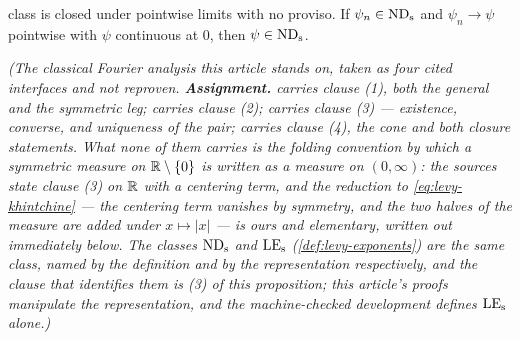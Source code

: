 \begin{proposition}
\begin{enumerate}
class is closed under pointwise limits with no proviso. If $\psi_n \in \mathrm{ND}_{\mathrm{s}}$ and
$\psi_n \to \psi$ pointwise with $\psi$ continuous at $0$, then $\psi \in \mathrm{ND}_{\mathrm{s}}$.
\end{enumerate}
\statusA\quad{}\quad{}\quad{}\quad{}\quad\emph{(The
classical Fourier analysis this article stands on, taken as four cited interfaces and not
reproven. \textbf{Assignment.}  carries clause (1), both the general and the
symmetric leg;  carries clause (2);  carries clause (3) --- existence,
converse, and uniqueness of the pair;  carries clause (4), the cone and both
closure statements. What none of them carries is the \emph{folding} convention by which a
symmetric \Levy{} measure on $\mathbb{R} \setminus \{0\}$ is written as a measure on $(0,\infty)$: the
sources state clause (3) on $\mathbb{R}$ with a centering term, and the reduction to
\ref{eq:levy-khintchine} --- the centering term vanishes by symmetry, and the two halves of
the measure are added under $x \mapsto |x|$ --- is ours and elementary, written out
immediately below. The classes $\mathrm{ND}_{\mathrm{s}}$ and $\mathrm{LE}_{\mathrm{s}}$ (\ref{def:levy-exponents}) are the same class,
named by the definition and by the representation respectively, and the clause that identifies
them is (3) of this proposition; this article's proofs manipulate the representation, and the
machine-checked development defines $\mathrm{LE}_{\mathrm{s}}$ alone.)}
\end{proposition}

